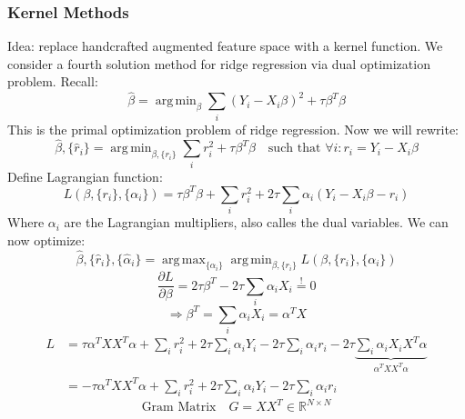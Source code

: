 \documentclass[11pt]{article}
\DeclareMathOperator*{\argmin}{arg\,min}
\DeclareMathOperator*{\argmax}{arg\,max}
\begin{document}
    \subsubsection{Kernel Methods}
    Idea: replace handcrafted augmented feature space with a kernel function. We
    consider a fourth solution method for ridge regression via dual optimization problem.
    Recall:
    \begin{equation*}
      \hat{\beta} = \argmin_\beta \sum_i (Y_i-X_i \beta)^2+\tau \beta^T \beta
    \end{equation*}
    This is the primal optimization problem of ridge regression. Now we will rewrite:
    \begin{equation*}
      \hat{\beta}, \{ \hat{r}_i \} = \argmin_{\beta, \{ r_i \}} \sum_i r_i^2 +
      \tau \beta^T \beta \quad \text{such that } \forall i: r_i=Y_i-X_i\beta
    \end{equation*}
    Define Lagrangian function:
    \begin{equation*}
      L(\beta, \{ r_i \}, \{ \alpha_i \})=\tau \beta^T\beta+\sum_i r_i^2+
      2 \tau \sum_i \alpha_i (Y_i-X_i\beta-r_i)
    \end{equation*}
    Where $\alpha_i$ are the Lagrangian multipliers, also calles the dual variables.
    We can now optimize:
    \begin{equation*}
      \boxed{\hat{\beta}, \{ \hat{r}_i \}, \{ \hat{\alpha}_i \} = \argmax_{\{ \alpha_i \}}
      \argmin_{\beta, \{ r_i \} } L(\beta, \{r_i\}, \{ \alpha_i \})}
    \end{equation*}
    \begin{equation*}
      \frac{\partial L}{\partial \beta}=2\tau\beta^T-2\tau \sum_i \alpha_i X_i
      \overset{!}{=} 0
    \end{equation*}
    \begin{equation*}
      \Rightarrow \beta^T=\sum_i \alpha_i X_i = \alpha^T X
    \end{equation*}
    \begin{equation*}
      \begin{align*}
      L &= \tau \alpha^T X X^T \alpha+\sum_i r_i^2 + 2\tau \sum_i \alpha_i Y_i -
      2 \tau \sum_i \alpha_i r_i - 2\tau \underbrace{\sum_i \alpha_i X_i X^T \alpha}_
      {\alpha^T X X^T \alpha} \\
      &= -\tau \alpha^T X X^T \alpha + \sum_i r_i^2 +2\tau\sum_i\alpha_iY_i-2\tau\sum_i\alpha_ir_i
      \end{align*}
    \end{equation*}
    \begin{equation*}
      \text{Gram Matrix} \quad G = XX^T \in \mathbb{R}^{N \times N}
    \end{equation*}
\end{document}
